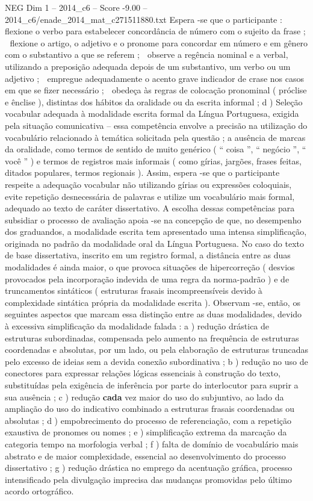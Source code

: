 \begin{textsample}{NEG Dim 1 – 2014\_c6 – Score -9.00 – 2014\_c6/enade\_2014\_mat\_c271511880.txt}
Espera -se que o participante :  flexione o verbo para estabelecer concordância de número com o sujeito da frase ;  flexione o artigo, o adjetivo e o pronome para concordar em número e em gênero com o substantivo a que se referem ;  observe a regência nominal e a verbal, utilizando a preposição adequada depois de um substantivo, um verbo ou um adjetivo ;  empregue adequadamente o acento grave indicador de crase nos casos em que se fizer necessário ;  obedeça às regras de colocação pronominal ( próclise e ênclise ), distintas dos hábitos da oralidade ou da escrita informal ; d ) Seleção vocabular adequada à modalidade escrita formal da Língua Portuguesa, exigida pela situação comunicativa – essa competência envolve a precisão na utilização do vocabulário relacionado à temática solicitada pela questão ; a ausência de marcas da oralidade, como termos de sentido de muito genérico ( “ coisa ”, “ negócio ”, “ você ” ) e termos de registros mais informais ( como gírias, jargões, frases feitas, ditados populares, termos regionais ).
Assim, espera -se que o participante respeite a adequação vocabular não utilizando gírias ou expressões coloquiais, evite repetição desnecessária de palavras e utilize um vocabulário mais formal, adequado ao texto de caráter dissertativo.
A escolha dessas competências para subsidiar o processo de avaliação apoia -se na concepção de que, no desempenho dos graduandos, a modalidade escrita tem apresentado uma intensa simplificação, originada no padrão da modalidade oral da Língua Portuguesa.
No caso do texto de base dissertativa, inscrito em um registro formal, a distância entre as duas modalidades é ainda maior, o que provoca situações de hipercorreção ( desvios provocados pela incorporação indevida de uma regra da norma-padrão ) e de truncamentos sintáticos ( estruturas frasais incompreensíveis devido à complexidade sintática própria da modalidade escrita ).
Observam -se, então, os seguintes aspectos que marcam essa distinção entre as duas modalidades, devido à excessiva simplificação da modalidade falada : a ) redução drástica de estruturas subordinadas, compensada pelo aumento na frequência de estruturas coordenadas e absolutas, por um lado, ou pela elaboração de estruturas truncadas pelo excesso de ideias sem a devida conexão subordinativa ; b ) redução no uso de conectores para expressar relações lógicas essenciais à construção do texto, substituídas pela exigência de inferência por parte do interlocutor para suprir a sua ausência ; c ) redução \textbf{cada} vez maior do uso do subjuntivo, ao lado da ampliação do uso do indicativo combinado a estruturas frasais coordenadas ou absolutas ; d ) empobrecimento do processo de referenciação, com a repetição exaustiva de pronomes ou nomes ; e ) simplificação extrema da marcação da categoria tempo na morfologia verbal ; f ) falta de domínio de vocabulário mais abstrato e de maior complexidade, essencial ao desenvolvimento do processo dissertativo ; g ) redução drástica no emprego da acentuação gráfica, processo intensificado pela divulgação imprecisa das mudanças promovidas pelo último acordo ortográfico.

\end{textsample}
